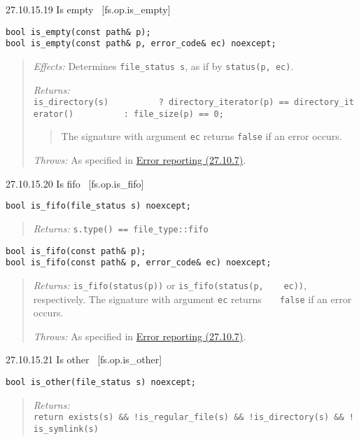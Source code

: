 27.10.15.19 Is empty~ {[}fs.op.is\_empty{]}

\begin{verbatim}
bool is_empty(const path& p);
bool is_empty(const path& p, error_code& ec) noexcept;
\end{verbatim}

\begin{quote}
\emph{Effects:} Determines \texttt{file\_status\ s}, as if by
\texttt{status(p,\ ec)}.

\emph{Returns:}
\texttt{is\_directory(s)\ ~~~~~~~~\ ?\ directory\_iterator(p)\ ==\ directory\_iterator()\ ~~~~~~~~\ :\ file\_size(p)\ ==\ 0;}

\begin{quote}
The signature with argument \texttt{ec} returns \texttt{false} if an
error occurs.
\end{quote}

\emph{Throws:} As specified in \hyperref[Error-reporting]{Error
reporting (27.10.7)}.
\end{quote}

27.10.15.20 Is fifo~ {[}fs.op.is\_fifo{]}

\begin{verbatim}
bool is_fifo(file_status s) noexcept;
\end{verbatim}

\begin{quote}
\emph{Returns:} \texttt{s.type()\ ==\ file\_type::fifo}
\end{quote}

\begin{verbatim}
bool is_fifo(const path& p);
bool is_fifo(const path& p, error_code& ec) noexcept;
\end{verbatim}

\begin{quote}
\emph{Returns:} \texttt{is\_fifo(status(p))} or
\texttt{is\_fifo(status(p,\ \ \ \ ec))}, respectively. The signature
with argument \texttt{ec} returns \texttt{\ \ \ false} if an error
occurs.

\emph{Throws:} As specified in \hyperref[Error-reporting]{Error
reporting (27.10.7)}.
\end{quote}

27.10.15.21 Is other~ {[}fs.op.is\_other{]}

\begin{verbatim}
bool is_other(file_status s) noexcept;
\end{verbatim}

\begin{quote}
\emph{Returns:}
\texttt{return\ exists(s)\ \&\&\ !is\_regular\_file(s)\ \&\&\ !is\_directory(s)\ \&\&\ !is\_symlink(s)}
\end{quote}

